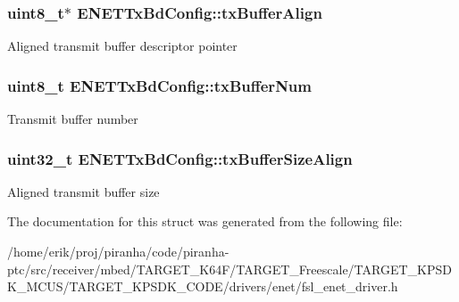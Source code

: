 \subsubsection[{\texorpdfstring{tx\+Buffer\+Align}{txBufferAlign}}]{\setlength{\rightskip}{0pt plus 5cm}uint8\+\_\+t$\ast$ E\+N\+E\+T\+Tx\+Bd\+Config\+::tx\+Buffer\+Align}\hypertarget{structENETTxBdConfig_aaeb96c5f5d549a2454f70541e9aaaddf}{}\label{structENETTxBdConfig_aaeb96c5f5d549a2454f70541e9aaaddf}
Aligned transmit buffer descriptor pointer 
\subsubsection[{\texorpdfstring{tx\+Buffer\+Num}{txBufferNum}}]{\setlength{\rightskip}{0pt plus 5cm}uint8\+\_\+t E\+N\+E\+T\+Tx\+Bd\+Config\+::tx\+Buffer\+Num}\hypertarget{structENETTxBdConfig_ab68fc55998aa161c23c0973b2fd59b47}{}\label{structENETTxBdConfig_ab68fc55998aa161c23c0973b2fd59b47}
Transmit buffer number 
\subsubsection[{\texorpdfstring{tx\+Buffer\+Size\+Align}{txBufferSizeAlign}}]{\setlength{\rightskip}{0pt plus 5cm}uint32\+\_\+t E\+N\+E\+T\+Tx\+Bd\+Config\+::tx\+Buffer\+Size\+Align}\hypertarget{structENETTxBdConfig_ad4b826f478a979e698e902de9324683d}{}\label{structENETTxBdConfig_ad4b826f478a979e698e902de9324683d}
Aligned transmit buffer size 

The documentation for this struct was generated from the following file\+:\begin{DoxyCompactItemize}
\item 
/home/erik/proj/piranha/code/piranha-\/ptc/src/receiver/mbed/\+T\+A\+R\+G\+E\+T\+\_\+\+K64\+F/\+T\+A\+R\+G\+E\+T\+\_\+\+Freescale/\+T\+A\+R\+G\+E\+T\+\_\+\+K\+P\+S\+D\+K\+\_\+\+M\+C\+U\+S/\+T\+A\+R\+G\+E\+T\+\_\+\+K\+P\+S\+D\+K\+\_\+\+C\+O\+D\+E/drivers/enet/fsl\+\_\+enet\+\_\+driver.\+h\end{DoxyCompactItemize}
